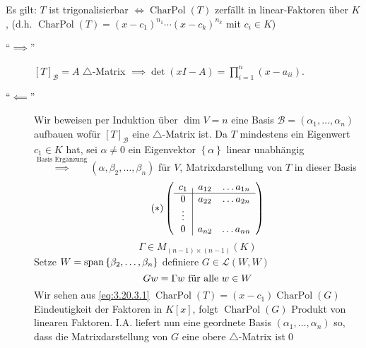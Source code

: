 \begin{subtheorem}
	Es gilt:
	$ T $ ist trigonalisierbar $ \iff \operatorname{Char Pol}(T) $ zerfällt in linear-Faktoren über $ K $,
	(d.h. $ \operatorname{Char Pol}(T) = \left( x - c_1 \right) ^{n_1} \dotsb \left( x - c_k \right) ^{n_k}  $ mit $ c_i \in K $)
\end{subtheorem}
\begin{subproof*}
	\begin{description}
		\item[``$ \implies  $'']
			$ [T]_{\mathcal{B} } = A $ $ \triangle $-Matrix $ \implies \det \left( xI - A \right) = \prod_{i = 1}^{n} \left( x - a_{ii}  \right)   $.
		\item[``$ \impliedby  $'']
			Wir beweisen per Induktion über $ \dim V = n $ eine Basis $ \mathcal{B} = \left( \alpha_1 , \dotsc, \alpha_n \right)  $ aufbauen wofür $ [T]_{\mathcal{B} }  $ eine $ \triangle $-Matrix ist.
			Da $ T $ mindestens ein Eigenwert $ c_1 \in K $ hat, sei $ \alpha \neq 0 $ ein Eigenvektor $ \left\{ \alpha \right\}  $ linear unabhängig $ \overset{\text{Basis Ergänzung} }{\implies } \left( \alpha, \beta_2, \dotsc, \beta_n \right)  $ für $ V $, Matrixdarstellung von $ T $ in dieser Basis
			\begin{equation}
				\label{eq:3.20.3.1}
				\tag{$ * $}
				\left( 
					\begin{array}{c | c c c}
						c_1 & a_{12} & \hdots a_{1n} \\ \hline
						0 & a_{22} & \hdots a_{2n} \\
						\vdots \\
						0 & a_{n2} & \hdots a_{nn} \\
					\end{array}
				\right) 
			\end{equation}
			\[
				\Gamma \in M_{(n - 1) \times (n - 1)} (K)
			\]
			Setze $ W = \operatorname{span} \left\{ \beta_2, \dotsc, \beta_n \right\}  $ definiere $ G \in \mathcal{L} \left( W, W \right)  $ 
			\[
				G w = \Gamma w \text{ für alle $ w \in W $} 
			\]
			Wir sehen aus \eqref{eq:3.20.3.1} $ \operatorname{Char Pol}(T) = (x - c_1) \operatorname{Char Pol}(G) $\\
			Eindeutigkeit der Faktoren in $ K[x] $, folgt $ \operatorname{Char Pol}(G) $ Produkt von linearen Faktoren.
			I.A. liefert nun eine geordnete Basis $ \left( \alpha_1, \dotsc, \alpha_n \right)  $ so, dass die Matrixdarstellung von $ G $ eine obere $ \triangle $-Matrix ist\qed
	\end{description}
\end{subproof*}

